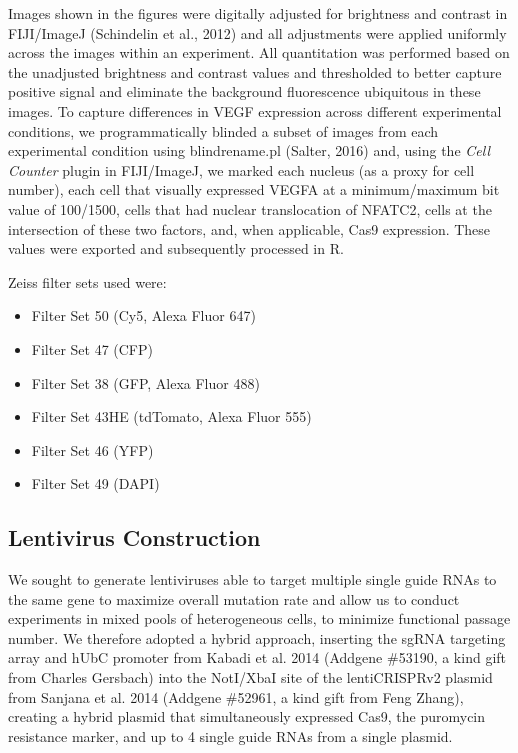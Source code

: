 Images shown in the figures were digitally adjusted for brightness and contrast in FIJI/ImageJ (Schindelin et al., 2012) and all adjustments were applied uniformly across the images within an experiment. All quantitation was performed based on the unadjusted brightness and contrast values and thresholded to better capture positive signal and eliminate the background fluorescence ubiquitous in these images.
To capture differences in VEGF expression across different experimental conditions, we programmatically blinded a subset of images from each experimental condition using blindrename.pl (Salter, 2016) and, using the \textit{Cell Counter} plugin in FIJI/ImageJ, we marked each nucleus (as a proxy for cell number), each cell that visually expressed VEGFA at a minimum/maximum bit value of 100/1500, cells that had nuclear translocation of NFATC2, cells at the intersection of these two factors, and, when applicable, Cas9 expression. These values were exported and subsequently processed in R.


Zeiss filter sets used were: 
\begin{itemize}
\item Filter Set 50 (Cy5, Alexa Fluor 647)
\item Filter Set 47 (CFP)
\item Filter Set 38 (GFP, Alexa Fluor 488)
\item Filter Set 43HE (tdTomato, Alexa Fluor 555)
\item Filter Set 46 (YFP)
\item Filter Set 49 (DAPI)
\end{itemize}

\subsection{Lentivirus Construction}

We sought to generate lentiviruses able to target multiple single guide RNAs to the same gene to maximize overall mutation rate and allow us to conduct experiments in mixed pools of heterogeneous cells, to minimize functional passage number. We therefore adopted a hybrid approach, inserting the sgRNA targeting array and hUbC promoter from Kabadi et al. 2014 (Addgene \#53190, a kind gift from Charles Gersbach) into the NotI/XbaI site of the lentiCRISPRv2 plasmid from Sanjana et al. 2014 (Addgene \#52961, a kind gift from Feng Zhang), creating a hybrid plasmid that simultaneously expressed Cas9, the puromycin resistance marker, and up to 4 single guide RNAs from a single plasmid.

